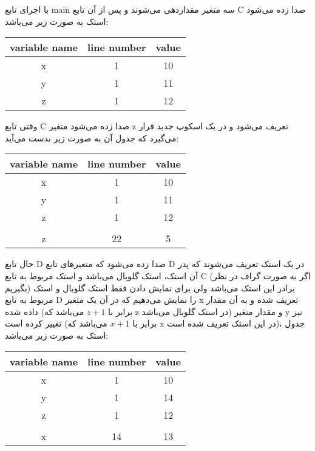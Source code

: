 \begin{enumerate}
	با اجرای تابع main سه متغیر مقداردهی می‌شوند و پس از آن تابع C صدا زده می‌شود استک به صورت زیر می‌باشد:
	\begin{latin}
		\begin{center}
			\begin{tabular}{|c|c|c|}
				\hline
				variable name & line number & value\\
				\hline
				x & 1 & 10\\
				\hline
				y & 1 & 11\\
				\hline
				z & 1 & 12\\
				\hline
			\end{tabular}
		\end{center}
	\end{latin}
	وقتی تابع C صدا زده می‌شود متغیر z تعریف می‌شود و در یک اسکوپ جدید قرار می‌گیرد که جدول آن به صورت زیر بدست می‌آید:
	\begin{latin}
		\begin{center}
			\begin{tabular}{|c|c|c|}
				\hline
				variable name & line number & value\\
				\hline
				x & 1 & 10\\
				\hline
				y & 1 & 11\\
				\hline
				z & 1 & 12\\
				\hline
				\rowcolor{black} \multicolumn{3}{|c|}{}\\
				\hline
				z & 22 & 5\\
				\hline
			\end{tabular}
		\end{center}
	\end{latin}
	حال تابع D صدا زده می‌شود که متعیر‌های تابع D در یک استک تعریف می‌شوند که پدر آن استک،‌ استک گلوبال می‌باشد و استک مربوط به تابع C (اگر به صورت گراف در نظر بگیریم) برادر این استک می‌باشد ولی برای نمایش دادن فقط استک گلوبال و استک مربوط به تابع D را نمایش می‌دهیم که در آن یک متغیر x تعریف شده و به آن مقدار داده شده (برابر با $z+1$ می‌باشد که z در استک گلوبال می‌باشد) و مقدار متغیر y نیز تغییر کرده است (برابر با $x+1$ می‌باشد که x در این استک تعریف شده است)، جدول استک به صورت زیر می‌باشد:
	\begin{latin}
		\begin{center}
			\begin{tabular}{|c|c|c|}
				\hline
				variable name & line number & value\\
				\hline
				x & 1 & 10\\
				\hline
				y & 1 & 14\\
				\hline
				z & 1 & 12\\
				\hline
				\rowcolor{black} \multicolumn{3}{|c|}{}\\
				\hline
				x & 14 & 13\\
				\hline
				

\end{tabular}
\end{center}
\end{latin}
\end{enumerate}
